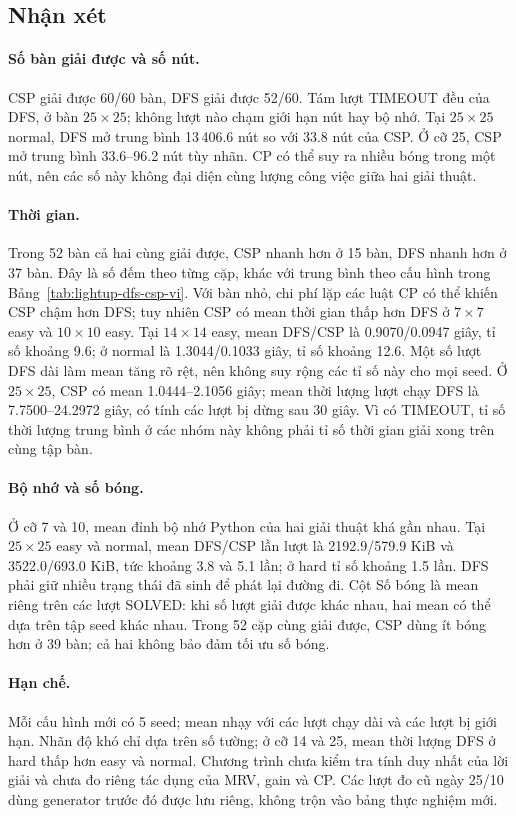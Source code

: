 \subsection{Nhận xét}
\paragraph{Số bàn giải được và số nút.} CSP giải được 60/60 bàn, DFS giải
được 52/60. Tám lượt TIMEOUT đều của DFS, ở bàn $25\times25$; không lượt nào
chạm giới hạn nút hay bộ nhớ. Tại $25\times25$ normal, DFS mở trung bình
13\,406.6 nút so với 33.8 nút của CSP. Ở cỡ 25, CSP mở trung bình 33.6--96.2
nút tùy nhãn. CP có thể suy ra nhiều bóng trong một nút, nên các số này không
đại diện cùng lượng công việc giữa hai giải thuật.

\paragraph{Thời gian.} Trong 52 bàn cả hai cùng giải được, CSP nhanh hơn ở
15 bàn, DFS nhanh hơn ở 37 bàn. Đây là số đếm theo từng cặp, khác với trung
bình theo cấu hình trong Bảng~\ref{tab:lightup-dfs-csp-vi}. Với bàn nhỏ,
chi phí lặp các luật CP có thể khiến CSP chậm hơn DFS; tuy nhiên CSP có mean
thời gian thấp hơn DFS ở $7\times7$ easy và $10\times10$ easy.
Tại $14\times14$ easy, mean DFS/CSP là 0.9070/0.0947 giây, tỉ số khoảng 9.6;
ở normal là 1.3044/0.1033 giây, tỉ số khoảng 12.6. Một số lượt DFS dài làm
mean tăng rõ rệt, nên không suy rộng các tỉ số này cho mọi seed.
Ở $25\times25$, CSP có mean 1.0444--2.1056 giây; mean thời lượng lượt chạy DFS
là 7.7500--24.2972 giây, có tính các lượt bị dừng sau 30 giây. Vì có TIMEOUT,
tỉ số thời lượng trung bình ở các nhóm này không phải tỉ số thời gian giải
xong trên cùng tập bàn.

\paragraph{Bộ nhớ và số bóng.} Ở cỡ 7 và 10, mean đỉnh bộ nhớ Python của
hai giải thuật khá gần nhau. Tại $25\times25$ easy và normal, mean DFS/CSP
lần lượt là 2192.9/579.9 KiB và 3522.0/693.0 KiB, tức khoảng 3.8 và 5.1 lần;
ở hard tỉ số khoảng 1.5 lần. DFS phải giữ nhiều trạng thái đã sinh để phát
lại đường đi. Cột Số bóng là mean riêng trên các lượt SOLVED: khi số lượt giải
được khác nhau, hai mean có thể dựa trên tập seed khác nhau. Trong 52 cặp
cùng giải được, CSP dùng ít bóng hơn ở 39 bàn; cả hai không bảo đảm tối ưu số bóng.

\paragraph{Hạn chế.} Mỗi cấu hình mới có 5 seed; mean nhạy với các lượt chạy
dài và các lượt bị giới hạn. Nhãn độ khó chỉ dựa trên số tường; ở cỡ 14 và 25,
mean thời lượng DFS ở hard thấp hơn easy và normal. Chương trình chưa kiểm
tra tính duy nhất của lời giải và chưa đo riêng tác dụng của MRV, gain và CP.
Các lượt đo cũ ngày 25/10 dùng generator trước đó được lưu riêng,
không trộn vào bảng thực nghiệm mới.
